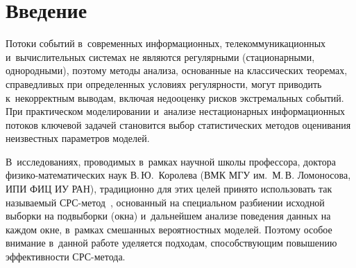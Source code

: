 


\thispagestyle{headings}

\begin{multicols}{2}

\label{st\stat}

\section{Введение}

Потоки событий в~современных информационных, телекоммуникационных и~вычислительных\linebreak 
сис\-те\-мах не являются регулярными (стационарными, однородными), поэтому методы 
анализа, основанные на классических теоремах, спра\-вед\-ливых при определенных 
условиях регулярности, могут приводить к~некорректным выводам, включая 
недо\-оцен\-ку рисков экстремальных событий. При практическом моделировании и~анализе 
нестационарных информационных потоков ключевой задачей становится выбор 
статистических методов оценивания неизвестных параметров моделей. 

В~исследованиях, 
проводимых в~рамках научной школы профессора, доктора фи\-зи\-ко-ма\-те\-ма\-ти\-че\-ских
наук  В.\,Ю.~Королева 
(ВМК МГУ им.\ М.\,В. Ломоносова, ИПИ ФИЦ ИУ РАН), традиционно для этих 
целей принято использовать так называемый СРС-ме\-тод~\cite{Korolev2011}, основанный на специальном разбиении 
исходной выборки на подвыборки (окна) и~дальнейшем анализе поведения данных на 
каж\-дом окне, в~рамках смешанных вероятностных моделей. Поэтому особое внимание в~данной 
работе уделяется подходам, способствующим повышению эффективности СРС-ме\-тода.


\end{multicols}
